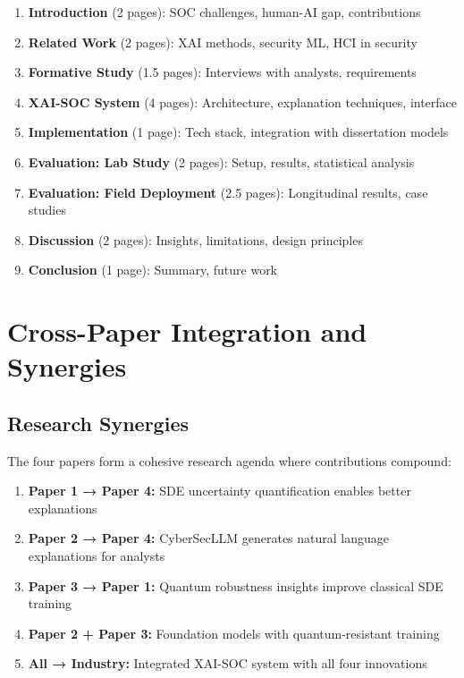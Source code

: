 \documentclass[11pt,letterpaper]{article}
\begin{document}
\begin{enumerate}
\item \textbf{Introduction} (2 pages): SOC challenges, human-AI gap, contributions
\item \textbf{Related Work} (2 pages): XAI methods, security ML, HCI in security
\item \textbf{Formative Study} (1.5 pages): Interviews with analysts, requirements
\item \textbf{XAI-SOC System} (4 pages): Architecture, explanation techniques, interface
\item \textbf{Implementation} (1 page): Tech stack, integration with dissertation models
\item \textbf{Evaluation: Lab Study} (2 pages): Setup, results, statistical analysis
\item \textbf{Evaluation: Field Deployment} (2.5 pages): Longitudinal results, case studies
\item \textbf{Discussion} (2 pages): Insights, limitations, design principles
\item \textbf{Conclusion} (1 page): Summary, future work
\end{enumerate}

\newpage

\section{Cross-Paper Integration and Synergies}

\subsection{Research Synergies}

The four papers form a cohesive research agenda where contributions compound:

\begin{enumerate}
\item \textbf{Paper 1 → Paper 4:} SDE uncertainty quantification enables better explanations
\item \textbf{Paper 2 → Paper 4:} CyberSecLLM generates natural language explanations for analysts
\item \textbf{Paper 3 → Paper 1:} Quantum robustness insights improve classical SDE training
\item \textbf{Paper 2 + Paper 3:} Foundation models with quantum-resistant training
\item \textbf{All → Industry:} Integrated XAI-SOC system with all four innovations
\end{enumerate}
\end{document}
